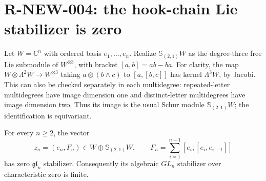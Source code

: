\section{R-NEW-004: the hook-chain Lie stabilizer is zero}

Let $W=\mathbb C^n$ with ordered basis $e_1,\ldots,e_n$.
Realize $\mathbb S_{(2,1)}W$ as the degree-three free Lie
submodule of $W^{\otimes3}$, with bracket $[a,b]=ab-ba$.
For clarity, the map
$W\otimes\Lambda^2W\to W^{\otimes3}$ taking
$a\otimes(b\wedge c)$ to $[a,[b,c]]$ has kernel
$\Lambda^3W$, by Jacobi.  This can also be checked separately
in each multidegree: repeated-letter multidegrees have image
dimension one and distinct-letter multidegrees have image
dimension two.  Thus its image is the usual Schur module
$\mathbb S_{(2,1)}W$; the identification is equivariant.

\begin{lemma}[R-NEW-004]
For every $n\ge2$, the vector
\[
 z_n=(e_n,F_n)\in W\oplus\mathbb S_{(2,1)}W,
 \qquad F_n=\sum_{i=1}^{n-1}[e_i,[e_i,e_{i+1}]]
\]
has zero $\mathfrak{gl}_n$ stabilizer.  Consequently its
algebraic $GL_n$ stabilizer over characteristic zero is finite.
\end{lemma}

